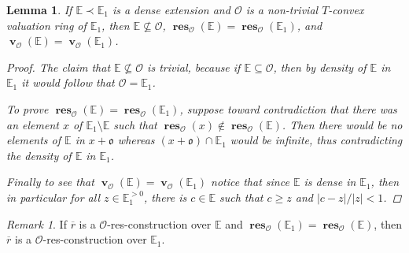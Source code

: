 \documentclass{amsart}
\newtheorem{lemma}[theorem]{Lemma}
\theoremstyle{remark}
\newtheorem{remark}[theorem]{Remark}
\theoremstyle{definition}
\theoremstyle{plain}
\newcommand{\bE}{\mathbb E}
\newcommand{\cO}{\mathcal O}
\newcommand{\co}{\mathfrak o}
\DeclareMathOperator{\val}{\mathbf{v}}
\DeclareMathOperator{\res}{\mathbf{res}}
\theoremstyle{plain}
\begin{document}
\begin{lemma}\label{lem:res-dense_ortho_one}
    If $\bE \prec \bE_1$ is a dense extension and $\cO$ is a non-trivial $T$-convex valuation ring of $\bE_1$, then $\bE \not \subseteq \cO$, $\res_\cO(\bE)=\res_\cO(\bE_1)$, and $\val_\cO(\bE)=\val_\cO(\bE_1)$.
    \begin{proof}
        The claim that $\bE \not \subseteq \cO$ is trivial, because if $\bE \subseteq \cO$, then by density of $\bE$ in $\bE_1$ it would follow that $\cO=\bE_1$. 
        
        To prove $\res_\cO(\bE)=\res_\cO(\bE_1)$, suppose toward contradiction that there was an element $x$ of $\bE_1 \setminus \bE$ such that $\res_{\cO}(x)\notin \res_{\cO}(\bE)$. Then there would be no elements of $\bE$ in $x + \co$ whereas $(x+\co)\cap \bE_1$ would be infinite, thus contradicting the density of $\bE$ in $\bE_1$.

        Finally to see that $\val_{\cO}(\bE)=\val_{\cO}(\bE_1)$ notice that since $\bE$ is dense in $\bE_1$, then in particular for all $z \in \bE_1^{>0}$, there is $c \in \bE$ such that $c\geq z$ and $|c-z|/|z|<1$.
    \end{proof}  
\end{lemma}

\begin{remark}\label{rmk:res_constr_lift}
    If $\overline{r}$ is a $\cO$-res-construction over $\bE$ and $\res_\cO(\bE_1)=\res_\cO(\bE)$, then $\overline{r}$ is a $\cO$-res-construction over $\bE_1$.
\end{remark}
\end{document}
